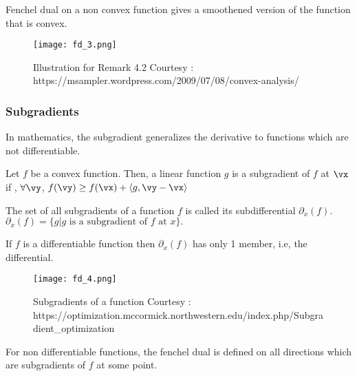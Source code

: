 \documentclass[a4paper,11pt]{article}
\begin{document}
\begin{remark}
Fenchel dual on a non convex function gives a smoothened version of the function that is convex.
\end{remark}

\begin{figure}[ht!]
\centering
\texttt{[image: fd\_3.png]}
\caption{Illustration for Remark 4.2  \newline Courtesy :  https://msampler.wordpress.com/2009/07/08/convex-analysis/}
\end{figure}

\subsubsection{Subgradients}
In mathematics, the  subgradient  generalizes the derivative to functions which are not differentiable. 

\begin{definition}
Let $f$ be a convex function. Then, a linear function $g$ is a subgradient of $f$ at $\vx$  if , $\forall \vy$, \newline
\(f(\vy) \geq f(\vx) + \langle g,\vy-\vx \rangle \)
\end{definition}

\begin{definition}
The set of all subgradients of a function $f$ is called its subdifferential $\partial_x(f)$. 
\( \partial_x(f) = \{ g | g \text{ is a subgradient of } f \text{ at } x \}. \)  
\end{definition}

\begin{remark}
If $f$ is a differentiable function then  $\partial_x(f)$ has only 1 member, i.e, the differential.
\end{remark}

\begin{figure}[ht!]
\centering
\texttt{[image: fd\_4.png]}
\caption{Subgradients of a function  \newline Courtesy : https://optimization.mccormick.northwestern.edu/index.php/Subgradient\_optimization}
\end{figure}


\begin{remark}
For non differentiable functions, the fenchel dual is defined on all directions which are subgradients of $f$ at some point.
\end{remark}
\end{document}
